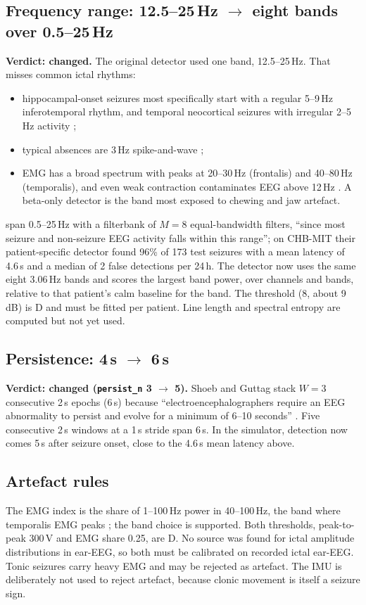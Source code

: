 \documentclass[10pt,a4paper]{article}
\newcommand{\becomes}{\texorpdfstring{$\rightarrow$}{to}}
\newcommand{\code}[1]{\texttt{\small #1}}
\newcommand{\lvl}[1]{\textsf{\small #1}}
\begin{document}
\subsection{Frequency range: 12.5--25\,Hz \becomes{} eight bands over 0.5--25\,Hz}\label{sec:bands}
\textbf{Verdict: changed.} The original detector used one band, 12.5--25\,Hz. That misses common ictal rhythms:
\begin{itemize}
  \item hippocampal-onset seizures most specifically start with a regular 5--9\,Hz inferotemporal rhythm, and temporal
        neocortical seizures with irregular 2--5\,Hz activity \parencite{ebersole1996};
  \item typical absences are 3\,Hz spike-and-wave \parencite{swinnen2021};
  \item EMG has a broad spectrum with peaks at 20--30\,Hz (frontalis) and 40--80\,Hz (temporalis), and even weak
        contraction contaminates EEG above 12\,Hz \parencite{goncharova2003}. A beta-only detector is the band most
        exposed to chewing and jaw artefact.
\end{itemize}
\textcite{shoeb2010} span 0.5--25\,Hz with a filterbank of $M=8$ equal-bandwidth filters, ``since most seizure and
non-seizure EEG activity falls within this range''; on CHB-MIT their patient-specific detector found 96\% of 173 test
seizures with a mean latency of 4.6\,s and a median of 2 false detections per 24\,h. The detector now uses the same
eight 3.06\,Hz bands and scores the largest band power, over channels and bands, relative to that patient's calm
baseline for the band. The threshold (8, about 9\,dB) is \lvl{D} and must be fitted per patient. Line length
\parencite{esteller2001} and spectral entropy are computed but not yet used.

\subsection{Persistence: 4\,s \becomes{} 6\,s}
\textbf{Verdict: changed (\code{persist\_n} 3 $\rightarrow$ 5).} Shoeb and Guttag stack $W=3$ consecutive 2\,s epochs
(6\,s) because ``electroencephalographers require an EEG abnormality to persist and evolve for a minimum of 6--10
seconds'' \parencite{shoeb2010}. Five consecutive 2\,s windows at a 1\,s stride span 6\,s. In the simulator, detection
now comes 5\,s after seizure onset, close to the 4.6\,s mean latency above.

\subsection{Artefact rules}\label{sec:artefact}
The EMG index is the share of 1--100\,Hz power in 40--100\,Hz, the band where temporalis EMG peaks
\parencite{goncharova2003}; the band choice is supported. Both thresholds, peak-to-peak 300\,\textmu V and EMG share
0.25, are \lvl{D}. No source was found for ictal amplitude distributions in ear-EEG, so both must be calibrated on
recorded ictal ear-EEG. Tonic seizures carry heavy EMG and may be rejected as artefact. The IMU is deliberately not used
to reject artefact, because clonic movement is itself a seizure sign.
\end{document}
